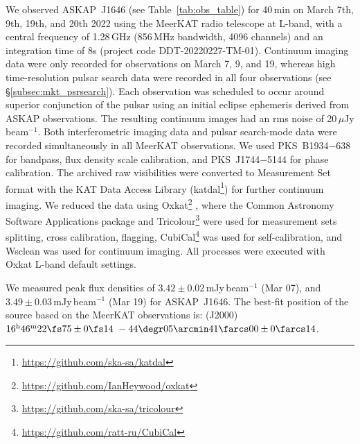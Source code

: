 \documentclass[fleqn,usenatbib]{mnras}
\newcommand{\todo}[1]{\textcolor{red}{TODO: #1}\PackageWarning{TODO:}{#1!}}
\newcommand{\blinkyaskap}{{ASKAP}~J1646}
\begin{document}
We observed \blinkyaskap{} (see Table~\ref{tab:obs_table}) for 40\,min on March 7th, 9th, 19th, and 20th 2022 using the MeerKAT radio telescope at L-band, with a central frequency of 1.28\,GHz (856\,MHz bandwidth, 4096 channels) and an integration time of 8s (project code DDT-20220227-TM-01). Continuum imaging data were only recorded for observations on March 7, 9, and 19, whereas high time-resolution pulsar search data were recorded in all four observations (see \S \ref{subsec:mkt_psrsearch}). %
Each observation was scheduled to occur around superior conjunction of the pulsar using an initial eclipse ephemeris derived from ASKAP observations. The resulting continuum images had an rms noise of 20\,$\mu$Jy beam$^{-1}$. Both interferometric imaging data and pulsar search-mode data were recorded simultaneously in all MeerKAT observations. 
We used {PKS~B1934$-$638} for bandpass, flux density scale calibration, and {PKS~J1744$-$5144} for phase calibration. %
The archived raw visibilities were converted to Measurement Set format with the KAT Data Access Library ({\sc katdal}\footnote{\url{https://github.com/ska-sa/katdal}}) for further continuum imaging. 
We reduced the data using {\sc Oxkat}\footnote{\url{https://github.com/IanHeywood/oxkat}} \citep[v0.3;][]{2020ascl.soft09003H}, where the Common Astronomy Software Applications \citep[CASA;][]{2007ASPC..376..127M} package and {\sc Tricolour}\footnote{\url{https://github.com/ska-sa/tricolour}} \citep{2022ASPC..532..541H} were used for measurement sets splitting, cross calibration, flagging, {\sc CubiCal}\footnote{\url{https://github.com/ratt-ru/CubiCal}} \citep{2018MNRAS.478.2399K} was used for self-calibration, and {\sc Wsclean} \citep{2014MNRAS.444..606O} was used for continuum imaging. All processes were executed with {\sc Oxkat} L-band default settings. 

We measured peak flux densities of $3.42\pm0.02$\,mJy\,beam$^{-1}$ (Mar 07),  and $3.49\pm0.03$\,mJy\,beam$^{-1}$ (Mar 19) for \blinkyaskap{}. %
The best-fit position of the source based on the MeerKAT observations is: (J2000) $16^{\rm h}46^{\rm m}22\fs75\pm0\fs14~-44\degr05\arcmin41\farcs00\pm0\farcs14$.
\end{document}
